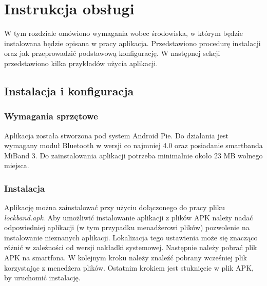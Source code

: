 \chapter{Instrukcja obsługi}
\thispagestyle{chapterBeginStyle}
\label{rozdzial4}

W tym rozdziale omówiono wymagania wobec środowiska, w którym będzie instalowana będzie opisana w pracy aplikacja. Przedstawiono procedurę instalacji oraz jak przeprowadzić podstawową konfigurację. W następnej sekcji przedstawiono kilka przykładów użycia aplikacji.

\section{Instalacja i konfiguracja}
\subsection{Wymagania sprzętowe}
Aplikacja została stworzona pod system Android Pie. Do działania jest wymagany moduł Bluetooth w wersji co najmniej 4.0 oraz posiadanie smartbanda MiBand 3. Do zainstalowania aplikacji potrzeba minimalnie około 23 MB wolnego miejsca. 
\subsection{Instalacja}
Aplikację można zainstalować przy użyciu dołączonego do pracy pliku \textit{lockband.apk}. Aby umożliwić instalowanie aplikacji z plików APK należy nadać odpowiedniej aplikacji (w tym przypadku menadżerowi plików) pozwolenie na instalowanie nieznanych aplikacji. Lokalizacja tego ustawienia może się znacząco różnić w zależności od wersji nakładki systemowej. Następnie należy pobrać plik APK na smartfona. W kolejnym kroku należy znaleźć pobrany wcześniej plik korzystając z menedżera plików. Ostatnim krokiem jest stuknięcie w plik APK, by uruchomić instalację.
